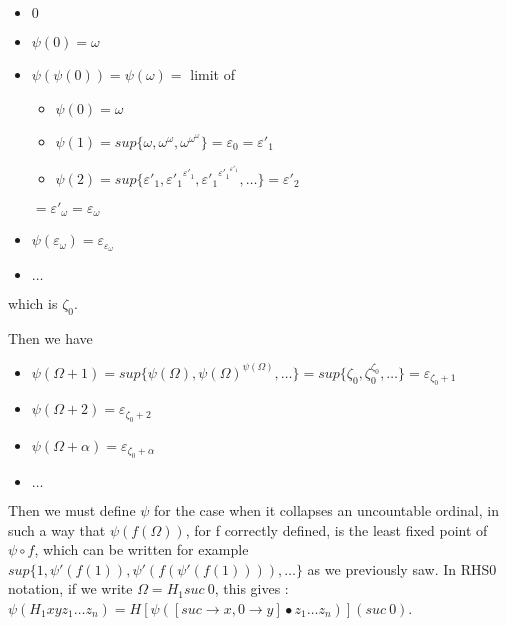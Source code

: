 \documentclass[10pt]{article}
\begin{document}
\begin{itemize}
     \setlength{\itemsep}{1pt}
     \setlength{\parskip}{0pt}
     \setlength{\parsep}{0pt}
\item \( 0 \)
\item \( \psi(0) = \omega \)
\item \( \psi(\psi(0)) = \psi(\omega) = \) limit of
	\begin{itemize}
	     \setlength{\itemsep}{1pt}
	     \setlength{\parskip}{0pt}
	     \setlength{\parsep}{0pt}
	\item \( \psi(0) = \omega \)
	\item \( \psi(1) =  sup \lbrace \omega, \omega^\omega, \omega^{\omega^\omega} \rbrace = \varepsilon_0 = \varepsilon'_1 \)
	\item \( \psi(2) = sup \lbrace \varepsilon'_1, {\varepsilon'_1}^{\varepsilon'_1}, {\varepsilon'_1}^{{\varepsilon'_1}^{\varepsilon'_1}}, \ldots \rbrace = \varepsilon'_2 \)
	\end{itemize}
	\( = \varepsilon'_\omega = \varepsilon_\omega \)
\item \( \psi(\varepsilon_\omega) = \varepsilon_{\varepsilon_\omega} \)
\item \( \ldots \)
\end{itemize}

which is \( \zeta_0 \).

Then we have

\begin{itemize}
     \setlength{\itemsep}{1pt}
     \setlength{\parskip}{0pt}
     \setlength{\parsep}{0pt}
\item \( \psi(\Omega+1) = sup \lbrace \psi(\Omega), \psi(\Omega)^{\psi(\Omega)}, \ldots \rbrace = sup \lbrace \zeta_0, \zeta_0^{\zeta_0}, \ldots \rbrace = \varepsilon_{\zeta_0+1} \)
\item \( \psi(\Omega+2) = \varepsilon_{\zeta_0+2} \)
\item \( \psi(\Omega+\alpha) = \varepsilon_{\zeta_0+\alpha} \)

\item \( \ldots \)
\end{itemize}

\bigskip

Then we must define \( \psi \) for the case when it collapses an uncountable ordinal, in such a way that \( \psi(f(\Omega)) \), for f correctly defined, is the least fixed point of \( \psi \circ f \), which can be written for example \( sup \lbrace 1, \psi'(f(1)), \psi'(f(\psi'(f(1)))), \ldots \rbrace \)  as we previously saw. In RHS0 notation, if we write \( \Omega = H_1 suc\ 0 \), this gives : \( \psi (H_1 x y z_1 \ldots z_n) = H [\psi([suc \rightarrow x, 0 \rightarrow y] \bullet z_1 \ldots z_n)] (suc\ 0) \).
\end{document}
